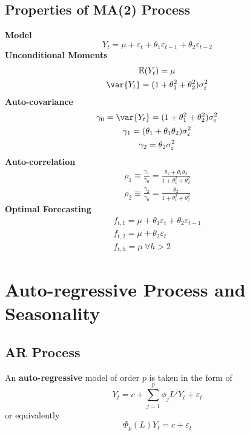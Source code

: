 \documentclass[11pt]{article}
\begin{document}
		\subsection{Properties of MA(2) Process}
			\textbf{Model}
				\begin{equation}
					Y_t = \mu + \varepsilon_t + \theta_1 \varepsilon_{t-1} + \theta_2 \varepsilon_{t-2}
				\end{equation}
			\textbf{Unconditional Moments}
				\begin{gather}
					\expect{Y_t} = \mu \\
					\var{Y_t} = (1 + \theta_1^2 + \theta_2^2) \sigma_\varepsilon^2
				\end{gather}
			\textbf{Auto-covariance}
				\begin{gather}
					\gamma_0 = \var{Y_t} = (1 + \theta_1^2 + \theta_2^2) \sigma_\varepsilon^2 \\
					\gamma_1 = (\theta_1 + \theta_1 \theta_2) \sigma_\varepsilon^2 \\
					\gamma_2 = \theta_2 \sigma_\varepsilon^2
				\end{gather}
			\textbf{Auto-correlation}
				\begin{gather}
					\rho_1 \equiv \frac{\gamma_1}{\gamma_0} = \frac{\theta_1 + \theta_1 \theta_2}{1 + \theta_1^2 + \theta_2^2} \\
					\rho_2 \equiv \frac{\gamma_2}{\gamma_0} = \frac{\theta_2}{1 + \theta_1^2 + \theta_2^2}
				\end{gather}
			\textbf{Optimal Forecasting}
				\begin{gather}
					f_{t, 1} = \mu + \theta_1 \varepsilon_t + \theta_2 \varepsilon_{t-1} \\
					f_{t, 2} = \mu + \theta_2 \varepsilon_t \\
					f_{t, h} = \mu\ \forall h > 2
				\end{gather}
	
	\section{Auto-regressive Process and Seasonality}
		\subsection{AR Process}
			\begin{definition}
				An \textbf{auto-regressive} model of order $p$ is taken in the form of 
				\begin{equation}
					Y_t = c + \sum_{j=1}^p \phi_j L^j Y_t + \varepsilon_t
				\end{equation}
				or equivalently
				\begin{equation}
					\Phi_p(L) Y_t = c + \varepsilon_t
				\end{equation}
			\end{definition}
			
\end{document}
